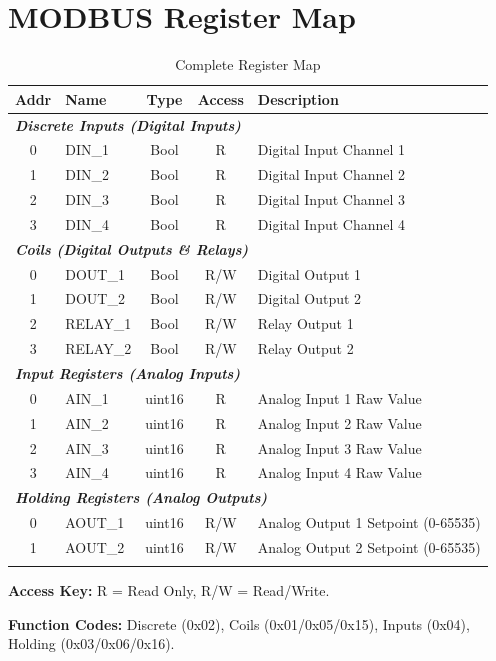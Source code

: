 \documentclass[10pt]{datasheet}
\begin{document}
\section{MODBUS Register Map}
\begin{table}[H]
\small
\begin{threeparttable}
\caption{Complete Register Map}
\begin{tabularx}{\textwidth}{c | l | c | c | X}
    \thickhline
    \textbf{Addr} & \textbf{Name} & \textbf{Type} & \textbf{Access} & \textbf{Description} \\
    \hline
    \multicolumn{5}{l}{\textit{\textbf{Discrete Inputs (Digital Inputs)}}} \\
    \hline
    0 & DIN\_1 & Bool & R & Digital Input Channel 1 \\
    1 & DIN\_2 & Bool & R & Digital Input Channel 2 \\
    2 & DIN\_3 & Bool & R & Digital Input Channel 3 \\
    3 & DIN\_4 & Bool & R & Digital Input Channel 4 \\
    \hline
    \multicolumn{5}{l}{\textit{\textbf{Coils (Digital Outputs \& Relays)}}} \\
    \hline
    0 & DOUT\_1 & Bool & R/W & Digital Output 1 \\
    1 & DOUT\_2 & Bool & R/W & Digital Output 2 \\
    2 & RELAY\_1 & Bool & R/W & Relay Output 1 \\
    3 & RELAY\_2 & Bool & R/W & Relay Output 2 \\
    \hline
    \multicolumn{5}{l}{\textit{\textbf{Input Registers (Analog Inputs)}}} \\
    \hline
    0 & AIN\_1 & uint16 & R & Analog Input 1 Raw Value \\
    1 & AIN\_2 & uint16 & R & Analog Input 2 Raw Value \\
    2 & AIN\_3 & uint16 & R & Analog Input 3 Raw Value \\
    3 & AIN\_4 & uint16 & R & Analog Input 4 Raw Value \\
    \hline
    \multicolumn{5}{l}{\textit{\textbf{Holding Registers (Analog Outputs)}}} \\
    \hline
    0 & AOUT\_1 & uint16 & R/W & Analog Output 1 Setpoint (0-65535) \\
    1 & AOUT\_2 & uint16 & R/W & Analog Output 2 Setpoint (0-65535) \\
    \thickhline
\end{tabularx}
\begin{tablenotes}
\footnotesize
\item \textbf{Access Key:} R = Read Only, R/W = Read/Write. 
\item \textbf{Function Codes:} Discrete (0x02), Coils (0x01/0x05/0x15), Inputs (0x04), Holding (0x03/0x06/0x16).
\end{tablenotes}
\end{threeparttable}
\end{table}
\end{document}
